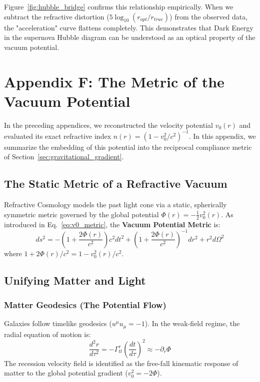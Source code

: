 \documentclass[11pt]{article}
\begin{document}
Figure~\ref{fig:hubble_bridge} confirms this relationship empirically. When we subtract the refractive distortion ($5 \log_{10}(r_{opt}/r_{true})$) from the observed data, the "acceleration" curve flattens completely. This demonstrates that Dark Energy in the supernova Hubble diagram can be understood as an optical property of the vacuum potential.

\section{Appendix F: The Metric of the Vacuum Potential}
\label{app:vacuum_metric}

In the preceding appendices, we reconstructed the velocity potential $v_0(r)$ and evaluated its exact refractive index $n(r) = (1 - v_0^2/c^2)^{-1}$. In this appendix, we summarize the embedding of this potential into the reciprocal compliance metric of Section~\ref{sec:gravitational_gradient}.

\subsection{The Static Metric of a Refractive Vacuum}

Refractive Cosmology models the past light cone via a static, spherically symmetric metric governed by the global potential $\Phi(r) = -\frac{1}{2}v_0^2(r)$. As introduced in Eq.~\ref{eq:v0_metric}, the \textbf{Vacuum Potential Metric} is:
\begin{equation}
    ds^2 = -\left(1 + \frac{2\Phi(r)}{c^2}\right) c^2 dt^2 + \left(1 + \frac{2\Phi(r)}{c^2}\right)^{-1} dr^2 + r^2 d\Omega^2
\end{equation}
where $1 + 2\Phi(r)/c^2 = 1 - v_0^2(r)/c^2$.

\subsection{Unifying Matter and Light}

\subsubsection{Matter Geodesics (The Potential Flow)}
Galaxies follow timelike geodesics ($u^\mu u_\mu = -1$). In the weak-field regime, the radial equation of motion is:
\begin{equation}
    \frac{d^2r}{d\tau^2} = -\Gamma^r_{tt} \left(\frac{dt}{d\tau}\right)^2 \approx -\partial_r \Phi
\end{equation}
The recession velocity field is identified as the free-fall kinematic response of matter to the global potential gradient ($v_0^2 = -2\Phi$).
\end{document}
